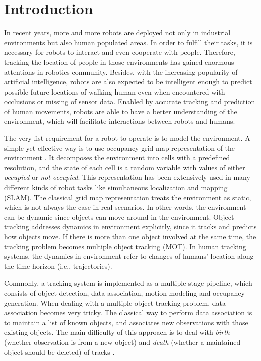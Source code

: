 \chapter{Introduction}

In recent years, more and more robots are deployed not only in industrial environments but also human populated areas. In order to fulfill their tasks, it is necessary for robots to interact and even cooperate with people. Therefore, tracking the location of people in those environments has gained enormous attentions in robotics community. Besides, with the increasing popularity of artificial intelligence, robots are also expected to be intelligent enough to predict possible future locations of walking human even when encountered with occlusions or missing of sensor data. Enabled by accurate tracking and prediction of human movements, robots are able to have a better understanding of the environment, which will facilitate interactions between robots and humans.

The very fist requirement for a robot to operate is to model the environment. A simple yet effective way is to use occupancy grid map representation of the environment \citep{elfes1989using}. It decomposes the environment into cells with a predefined resolution, and the state of each cell is a random variable with values of either \textit{occupied} or \textit{not occupied}. This representation has been extensively used in many different kinds of robot tasks like simultaneous localization and mapping (SLAM). The classical grid map representation treats the environment as static, which is not always the case in real scenarios. In other words, the environment can be dynamic since objects can move around in the environment. Object tracking addresses dynamics in environment explicitly, since it tracks and predicts how objects move. If there is more than one object involved at the same time, the tracking problem becomes multiple object tracking (MOT). In human tracking systems, the dynamics in environment refer to changes of humans' location along the time horizon (i.e., trajectories). 

Commonly, a tracking system is implemented as a multiple stage pipeline, which consists of object detection, data association, motion modeling and occupancy generation. When dealing with a multiple object tracking problem, data association becomes very tricky. The classical way to perform data association is to maintain a list of known objects, and associates new observations with those existing objects. The main difficulty of this approach is to deal with \textit{birth} (whether observation is from a new object) and \textit{death} (whether a maintained object should be deleted) of tracks \citep{gauvrit1997formulation}. 

